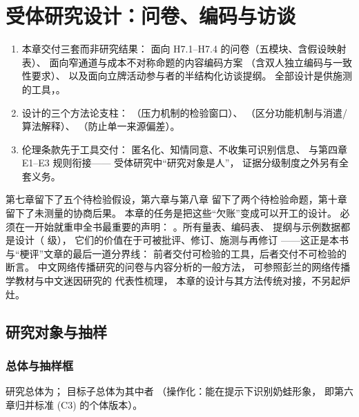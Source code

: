 \chapter{受体研究设计：问卷、编码与访谈}\label{ch:11}

\begin{nlkeypoints}
  \begin{enumerate}[label=(\arabic*),leftmargin=2.4em]
    \item 本章交付三套而非研究结果：
          面向 H7.1--H7.4 的问卷（五模块、含假设映射表）、
          面向窄通道与成本不对称命题的内容编码方案
          （含双人独立编码与一致性要求）、
          以及面向立牌活动参与者的半结构化访谈提纲。
          全部设计是供施测的工具，。
    \item 设计的三个方法论支柱：
          （压力机制的检验窗口）、
          （区分功能机制与消遣/算法解释）、
          （防止单一来源偏差）。
    \item 伦理条款先于工具交付：
          匿名化、知情同意、不收集可识别信息、
          与第四章 E1--E3 规则衔接——
          受体研究中“研究对象是人”，
          证据分级制度之外另有全套义务。
  \end{enumerate}
\end{nlkeypoints}

第七章留下了五个待检验假设，第六章与第八章
留下了两个待检验命题，第十章留下了未测量的协商后果。
本章的任务是把这些“欠账”变成可以开工的设计。
必须在一开始就重申全书最重要的声明：
。所有量表、编码表、
提纲与示例数据都是设计（ 级），
它们的价值在于可被批评、修订、施测与再修订
——这正是本书与“梗评”文章的最后一道分界线：
前者交付可检验的工具，后者交付不可检验的断言。
中文网络传播研究的问卷与内容分析的一般方法，
可参照彭兰的网络传播学教材与中文迷因研究的
代表性梳理\cite{penglan2007meme,caoqi2015meme}，
本章的设计与其方法传统对接，不另起炉灶。

\section{研究对象与抽样}\label{sec:11:sampling}

\subsection{总体与抽样框}

\begin{definition}\label{def:11:pop}
  研究总体为；
  目标子总体为其中者
  （操作化：能在提示下识别奶蛙形象，
  即第六章归并标准 (C3) 的个体版本）。
\end{definition}

